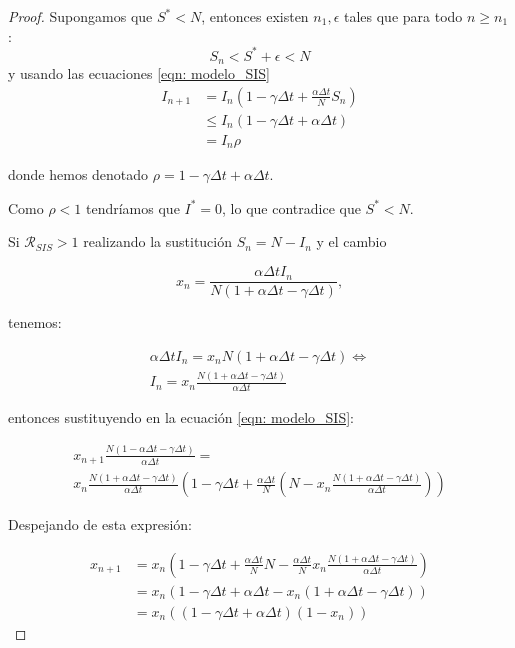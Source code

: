 \begin{proof}
Supongamos que $S^*<N$, entonces existen $n_1, \epsilon$ tales que para todo $n \geq n_1$:
$$S_n<S^*+\epsilon < N$$
y usando las ecuaciones \eqref{eqn: modelo_SIS}
\begin{equation}
\begin{aligned}
I_{n+1}  & = I_n \left( 1-\gamma \Delta t + \frac{\alpha\Delta t}{N} S_n \right) \\
& \leq I_n \left( 1-\gamma \Delta t + \alpha\Delta t \right) \\
& = I_n \rho 
\end{aligned}
\end{equation}


donde hemos denotado $\rho = 1-\gamma \Delta t + \alpha\Delta t$.

Como $\rho < 1$ tendríamos que $I^*=0$, lo que contradice que $S^*<N$.

Si $\mathcal{R}_{SIS}>1$ realizando la sustitución $S_n=N-I_n$ y el cambio

$$x_n=\frac{\alpha \Delta t I_n}{N(1+\alpha \Delta t - \gamma \Delta t)},$$

tenemos:

\begin{equation}
\begin{aligned}
\alpha\Delta t I_n = x_nN(1+\alpha\Delta t-\gamma\Delta t) \Leftrightarrow \\
I_n = x_n\frac{N(1+\alpha\Delta t - \gamma\Delta t)}{\alpha\Delta t}
\end{aligned}
\end{equation}

entonces sustituyendo en la ecuación \eqref{eqn: modelo_SIS}:

\begin{equation}
\begin{aligned}
x_{n+1}\frac{N(1-\alpha\Delta t-\gamma\Delta t)}{\alpha \Delta t} = \\ x_n\frac{N(1+\alpha\Delta t-\gamma \Delta t)}{\alpha\Delta t}\left( 1-\gamma\Delta t+\frac{\alpha\Delta t}{N}\left(N-x_n\frac{N(1+\alpha\Delta t-\gamma\Delta t)}{\alpha\Delta t}\right) \right)
\end{aligned}
\end{equation}

Despejando de esta expresión:

\begin{equation}
\begin{aligned}
x_{n+1} & = x_n\left( 1-\gamma\Delta t+\frac{\alpha\Delta t}{N}N-\frac{\alpha\Delta t}{N}x_n\frac{N(1+\alpha\Delta t -\gamma \Delta t)}{\alpha\Delta t} \right) \\
& = x_n(1-\gamma\Delta t + \alpha\Delta t -x_n(1+\alpha\Delta t -\gamma\Delta t)) \\
& = x_n((1-\gamma\Delta t+\alpha\Delta t)(1-x_n))
\end{aligned}
\end{equation}


\end{proof}
